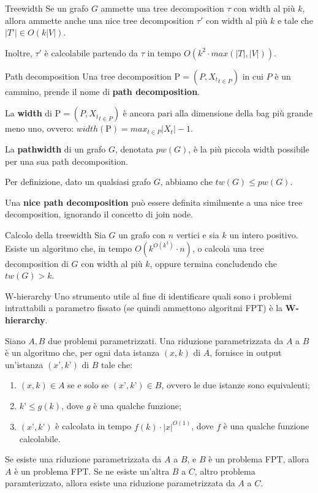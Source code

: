 \documentclass[10pt,a4paper]{article}
\begin{document}
\begin{multicols}{3}
\begin{textbox}{Treewidth}
Se un grafo \(G\) ammette una tree decomposition
\(\tau\) con width al più \(k\), allora ammette anche una nice
tree decomposition \(\tau'\) con width al più \(k\) e tale che
\(|T’|\in O(k|V|)\).

Inoltre, \(\tau'\) è calcolabile partendo da \(\tau\) in tempo \(O(k^2\cdot max(|T|, |V|)).\)
\end{textbox}



\begin{textbox}{Path decomposition}
Una tree decomposition \(\mathrm{P}=(P, {X_t}_{t\in P})\) in cui \(P\) è un cammino,
prende il nome di \textbf{path decomposition}.

La \textbf{width} di \(\mathrm{P}=(P, {X_t}_{t\in P})\) è ancora pari alla dimensione della bag
più grande meno uno, ovvero: \(width(\mathrm{P}) = max_{t\in P} |X_t|-1\).

La \textbf{pathwidth} di un grafo \(G\), denotata \(pw(G)\), è la più piccola width
possibile per una sua path decomposition.

Per definizione, dato un qualsiasi grafo \(G\), abbiamo che \(tw(G)\leq pw(G)\).

Una \textbf{nice path decomposition} può essere definita similmente a una nice
tree decomposition, ignorando il concetto di join node.
\end{textbox}

\begin{textbox}{Calcolo della treewidth}
Sia \(G\) un grafo con \(n\) vertici e sia \(k\)
un intero positivo. Esiste un algoritmo che, in tempo \(O(k^{O(k^3)}\cdot n)\), o
calcola una tree decomposition di \(G\) con width al più \(k\), oppure
termina concludendo che \(tw(G)>k\).
\end{textbox}


\begin{textbox}{W-hierarchy}
Uno strumento utile al fine di identificare quali sono i problemi
intrattabili a parametro fissato (se quindi ammettono algoritmi FPT) è la \textbf{W-hierarchy}.

Siano \(A, B\) due problemi parametrizzati. Una riduzione
parametrizzata da \(A\) a \(B\) è un algoritmo che, per ogni data
istanza \((x,k)\) di \(A\), fornisce in output un’istanza \((x’,k’)\) di \(B\) tale che:
\begin{enumerate}[leftmargin=*]
    \item \((x,k) \in A\) se e solo se \((x’,k’) \in B\), ovvero le due istanze sono equivalenti;
    \item \(k’ \leq g(k)\), dove \(g\) è una qualche funzione;
    \item \((x’,k’)\) è calcolata in tempo \(f(k)\cdot |x|^{O(1)}\), dove \(f\) è una qualche funzione calcolabile.
\end{enumerate}
Se esiste una riduzione parametrizzata da \(A\) a \(B\), e \(B\) è un problema
FPT, allora \(A\) è un problema FPT.
Se ne esiste un'altra \(B\) a \(C\), altro problema paramterizzato, allora esiste una riduzione parametrizzata da \(A\) a \(C\).
\end{textbox}


\end{multicols}
\end{document}
